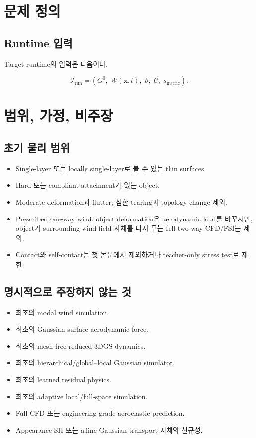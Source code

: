 \documentclass[11pt,a4paper]{article}
\begin{document}
\section{문제 정의}

\subsection{Runtime 입력}

Target runtime의 입력은 다음이다.

\begin{equation}
  \mathcal I_{\mathrm{run}}
  =
  \left(
    G^0,\;
    W(\mathbf x,t),\;
    \vartheta,\;
    \mathcal C,\;
    s_{\mathrm{metric}}
  \right).
\end{equation}

\section{범위, 가정, 비주장}

\subsection{초기 물리 범위}

\begin{itemize}[leftmargin=1.5em]
  \item Single-layer 또는 locally single-layer로 볼 수 있는 thin surfaces.
  \item Hard 또는 compliant attachment가 있는 object.
  \item Moderate deformation과 flutter; 심한 tearing과 topology change 제외.
  \item Prescribed one-way wind: object deformation은 aerodynamic load를 바꾸지만,
  object가 surrounding wind field 자체를 다시 푸는 full two-way CFD/FSI는 제외.
  \item Contact와 self-contact는 첫 논문에서 제외하거나 teacher-only stress test로 제한.
\end{itemize}

\subsection{명시적으로 주장하지 않는 것}

\begin{itemize}[leftmargin=1.5em]
  \item 최초의 modal wind simulation.
  \item 최초의 Gaussian surface aerodynamic force.
  \item 최초의 mesh-free reduced 3DGS dynamics.
  \item 최초의 hierarchical/global--local Gaussian simulator.
  \item 최초의 learned residual physics.
  \item 최초의 adaptive local/full-space simulation.
  \item Full CFD 또는 engineering-grade aeroelastic prediction.
  \item Appearance SH 또는 affine Gaussian transport 자체의 신규성.
\end{itemize}
\end{document}
